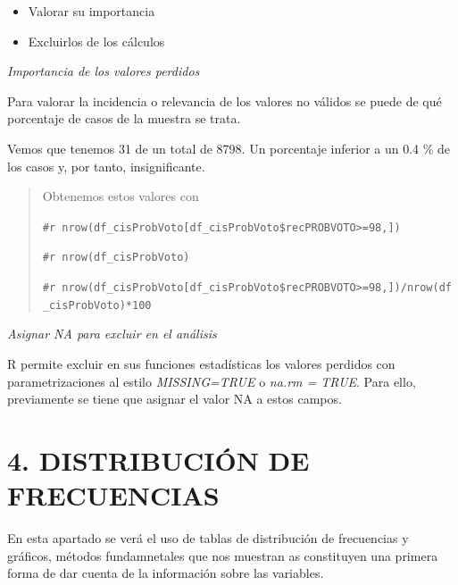 \documentclass[
]{article}
\newenvironment{Shaded}{\begin{snugshade}}{\end{snugshade}}
\newcommand{\ConstantTok}[1]{\textcolor[rgb]{0.56,0.35,0.01}{#1}}
\newcommand{\DecValTok}[1]{\textcolor[rgb]{0.00,0.00,0.81}{#1}}
\newcommand{\NormalTok}[1]{#1}
\newcommand{\OtherTok}[1]{\textcolor[rgb]{0.56,0.35,0.01}{#1}}
\newcommand{\SpecialCharTok}[1]{\textcolor[rgb]{0.81,0.36,0.00}{\textbf{#1}}}
\providecommand{\tightlist}{%
  \setlength{\itemsep}{0pt}\setlength{\parskip}{0pt}}
\begin{document}
\begin{itemize}
\tightlist
\item
  Valorar su importancia
\item
  Excluirlos de los cálculos
\end{itemize}

\emph{Importancia de los valores perdidos}

Para valorar la incidencia o relevancia de los valores no válidos se
puede de qué porcentaje de casos de la muestra se trata.

Vemos que tenemos 31 de un total de 8798. Un porcentaje inferior a un
0.4 \% de los casos y, por tanto, insignificante.

\begin{quote}
Obtenemos estos valores con

\texttt{\#r\ nrow(df\_cisProbVoto{[}df\_cisProbVoto\$recPROBVOTO\textgreater{}=98,{]})}

\texttt{\#r\ nrow(df\_cisProbVoto)}

\texttt{\#r\ nrow(df\_cisProbVoto{[}df\_cisProbVoto\$recPROBVOTO\textgreater{}=98,{]})/nrow(df\_cisProbVoto)*100}
\end{quote}

\emph{Asignar NA para excluir en el análisis}

R permite excluir en sus funciones estadísticas los valores perdidos con
parametrizaciones al estilo \emph{MISSING=TRUE} o \emph{na.rm = TRUE}.
Para ello, previamente se tiene que asignar el valor NA a estos campos.

\begin{Shaded}
\end{Shaded}

\hypertarget{distribuciuxf3n-de-frecuencias}{%
\section{4. DISTRIBUCIÓN DE
FRECUENCIAS}\label{distribuciuxf3n-de-frecuencias}}

En esta apartado se verá el uso de tablas de distribución de frecuencias
y gráficos, métodos fundamnetales que nos muestran as constituyen una
primera forma de dar cuenta de la información sobre las variables.
\end{document}
